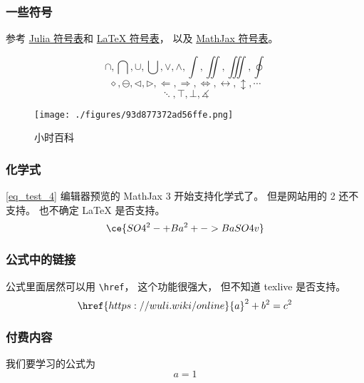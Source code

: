 
\subsubsection{一些符号}
参考 \href{https://docs.julialang.org/en/v1/manual/unicode-input/}{Julia 符号表}和 \href{https://oeis.org/wiki/List_of_LaTeX_mathematical_symbols}{LaTeX 符号表}， 以及 \href{http://www.onemathematicalcat.org/MathJaxDocumentation/TeXSyntax.htm}{MathJax 符号表}。

\begin{equation}\label{eq_test_4}
\cap, \bigcap, \cup, \bigcup, \vee, \wedge, \int, \iint, \iiint, \oint
\end{equation}
\begin{equation}\label{eq_test_6}
\diamond, \ominus, \triangleleft, \triangleright, \Longleftarrow, \Longrightarrow, \iff, \leftrightarrow, \updownarrow, \cdots
\end{equation}
\begin{equation}\label{eq_test_5}
\ddots, \top, \bot, \measuredangle
\end{equation}

\begin{figure}[ht]
\centering
\texttt{[image: ./figures/93d877372ad56ffe.png]}
\caption{小时百科} \label{fig_test_1}
\end{figure}

\subsubsection{化学式}
\autoref{eq_test_4} 编辑器预览的 MathJax 3 开始支持化学式了。 但是网站用的 2 还不支持。 也不确定 LaTeX 是否支持。
\begin{equation}
\ce{SO4^2- + Ba^2+ -> BaSO4 v}
\end{equation}

\subsubsection{公式中的链接}
公式里面居然可以用 \verb|\href|， 这个功能很强大， 但不知道 texlive 是否支持。
\begin{equation}
\href{https://wuli.wiki/online}{a}^2 + b^2 = c^2
\end{equation}

\subsubsection{付费内容}
我们要学习的公式为
\begin{equation}\label{eq_test_1}
a = 1
\end{equation}

